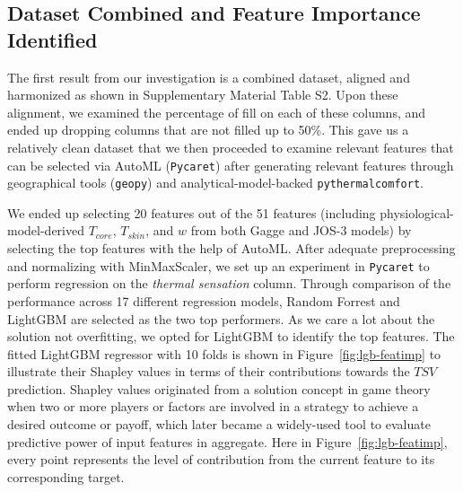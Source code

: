\subsection{Dataset Combined and Feature Importance Identified}
The first result from our investigation is a combined dataset, aligned and harmonized as shown in Supplementary Material Table S2. Upon these alignment, we examined the percentage of fill on each of these columns, and ended up dropping columns that are not filled up to 50\%. This gave us a relatively clean dataset that we then proceeded to examine relevant features that can be selected via AutoML (\texttt{Pycaret}) after generating relevant features through geographical tools (\texttt{geopy}) and analytical-model-backed \texttt{pythermalcomfort}.

We ended up selecting 20 features out of the 51 features (including physiological-model-derived $T_{core}$, $T_{skin}$, and $w$ from both Gagge and JOS-3 models) by selecting the top features with the help of AutoML. After adequate preprocessing and normalizing with MinMaxScaler, we set up an experiment in \texttt{Pycaret} to perform regression on the \textit{thermal sensation} column. Through comparison of the performance across 17 different regression models, Random Forrest and LightGBM are selected as the two top performers. As we care a lot about the solution not overfitting, we opted for LightGBM to identify the top features. The fitted LightGBM regressor with 10 folds is shown in Figure~\ref{fig:lgb-featimp} to illustrate their Shapley values in terms of their contributions towards the $TSV$ prediction. Shapley values originated from a solution concept in game theory when two or more players or factors are involved in a strategy to achieve a desired outcome or payoff, which later became a widely-used tool to evaluate predictive power of input features in aggregate. Here in Figure~\ref{fig:lgb-featimp}, every point represents the level of contribution from the current feature to its corresponding target.

